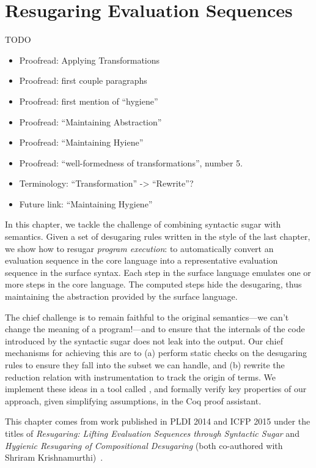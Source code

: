 \chapter{Resugaring Evaluation Sequences}\label{chap:resugar-eval}

TODO
\begin{itemize}
\item Proofread: Applying Transformations
\item Proofread: first couple paragraphs
\item Proofread: first mention of ``hygiene''
\item Proofread: ``Maintaining Abstraction''
\item Proofread: ``Maintaining Hyiene''
\item Proofread: ``well-formedness of transformations'', number 5.
\item Terminology: ``Transformation'' -> ``Rewrite''?
\item Future link: ``Maintaining Hygiene''
\end{itemize}


In this chapter, we tackle the challenge of combining syntactic sugar with
semantics. Given a set of desugaring rules written in the style of the
last chapter, we show how to resugar \emph{program execution}:
to automatically convert an
evaluation sequence in the core language into a representative
evaluation sequence in the surface syntax. Each step in the surface
language emulates one or more steps
in the core language. The computed steps hide the desugaring, thus
maintaining the abstraction provided by the surface language.

The chief challenge is to
remain faithful to the original semantics---we can't change the meaning of
a program!---and to ensure that the internals of the code introduced by
the syntactic sugar does not leak into the output. Our chief mechanisms
for achieving this are to (a) perform static checks on the desugaring
rules to ensure they fall into the subset we can handle, and (b)
rewrite the reduction relation with instrumentation to track the origin of
terms. We implement these ideas in a tool called {\Resugarer}, and
formally verify key properties of our approach, given simplifying
assumptions, in the Coq proof assistant.

This chapter comes from work published in PLDI 2014 and ICFP 2015
under the titles of \emph{Resugaring: Lifting Evaluation Sequences
  through Syntactic Sugar} and \emph{Hygienic Resugaring of
  Compositional Desugaring} (both co-authored with Shriram
Krishnamurthi)~\cite{pombrio-resugar,pombrio-resugar-hygienic}.


